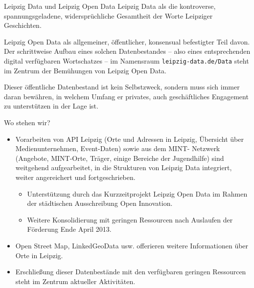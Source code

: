 \documentclass{beamer}
\begin{document}
\begin{frame}{Leipzig Data und Leipzig Open Data}{}
Leipzig Data als die kontroverse, spannungsgeladene, widersprüchliche
Gesamtheit der Worte Leipziger Geschichten.\medskip

Leipzig Open Data als allgemeiner, öffentlicher, konsensual befestigter Teil
davon.  Der schrittweise Aufbau eines solchen Datenbestandes – also eines
entsprechenden digital verfügbaren Wortschatzes – im Namensraum
\texttt{leipzig-data.de/Data} steht im Zentrum der Bemühungen von Leipzig Open
Data. \medskip

Dieser öffentliche Datenbestand ist kein Selbstzweck, sondern muss sich immer
daran bewähren, in welchem Umfang er privates, auch geschäftliches Engagement
zu unterstützen in der Lage ist.
\end{frame}

\begin{frame}{Wo stehen wir?}{}
  \begin{itemize}
  \item Vorarbeiten von API Leipzig (Orte und Adressen in Leipzig, Übersicht
    über Medienunternehmen, Event-Daten) sowie aus dem MINT- Netzwerk
    (Angebote, MINT-Orte, Träger, einige Bereiche der Jugendhilfe) sind
    weitgehend aufgearbeitet, in die Strukturen von Leipzig Data integriert,
    weiter angereichert und fortgeschrieben.
    \begin{itemize}
    \item Unterstützung durch das Kurzzeitprojekt Leipzig Open Data im Rahmen
      der städtischen Ausschreibung Open Innovation.
    \item Weitere Konsolidierung mit geringen Ressourcen nach Auslaufen der
      Förderung Ende April 2013.
    \end{itemize}
  \item Open Street Map, LinkedGeoData usw. offerieren weitere Informationen
    über Orte in Leipzig.
  \item Erschließung dieser Datenbestände mit den verfügbaren geringen
    Ressourcen steht im Zentrum aktueller Aktivitäten.
  \end{itemize}
\end{frame}
\end{document}
